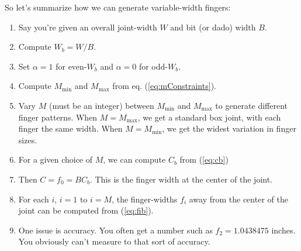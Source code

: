 \documentclass[12pt,final]{article}
\begin{document}
So let's summarize how we can generate variable-width fingers:
\begin{enumerate}
\item Say you're given an overall joint-width $W$ and bit (or dado) width $B$.
\item Compute $W_b = W / B$.
\item Set $\alpha = 1$ for even-$W_b$ and $\alpha = 0$ for odd-$W_b$.
\item Compute $M_{\min}$ and $M_{\max}$ from eq. (\ref{eq:mConstraints}).
\item Vary $M$ (must be an integer) between $M_{\min}$ and $M_{\max}$
  to generate different finger patterns.  When $M=M_{\max}$, we get a standard
  box joint, with each finger the same width.  When $M=M_{\min}$, we get the
  widest variation in finger sizes.
\item For a given choice of $M$, we can compute $C_b$ from (\ref{eq:cb})
\item Then $C = f_0 = B C_b$.  This is the finger width at the center of the
  joint.
\item For each $i$, $i = 1$ to $i = M$, the finger-widths $f_i$ away from the
  center of the joint can be computed from (\ref{eq:fib}).  
\item One issue is accuracy.  You often get a number such as $f_2 = 1.0438475$
  inches.  You obviously can't measure to that sort of accuracy.
\end{enumerate}
\end{document}
